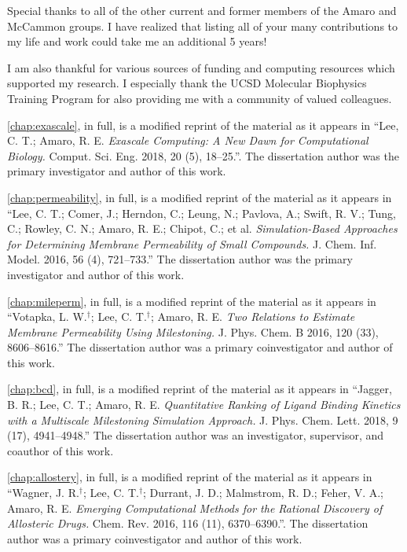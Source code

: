 \begin{frontmatter}
\begin{acknowledgements}
\par Special thanks to all of the other current and former members of the Amaro and McCammon groups.
I have realized that listing all of your many contributions to my life and work could take me an additional 5 years!

\par I am also thankful for various sources of funding and computing resources which supported my research.
I especially thank the UCSD Molecular Biophysics Training Program for also providing me with a community of valued colleagues.

\par \cref{chap:exascale}, in full, is a modified reprint of the material as it appears in ``Lee, C. T.; Amaro, R. E. \emph{Exascale Computing: A New Dawn for Computational Biology.} Comput. Sci. Eng. 2018, 20 (5), 18–25.''.
The dissertation author was the primary investigator and author of this work.

\par \cref{chap:permeability}, in full, is a modified reprint of the material as it appears in ``Lee, C. T.; Comer, J.; Herndon, C.; Leung, N.; Pavlova, A.; Swift, R. V.; Tung, C.; Rowley, C. N.; Amaro, R. E.; Chipot, C.; et al. \emph{Simulation-Based Approaches for Determining Membrane Permeability of Small Compounds.} J. Chem. Inf. Model. 2016, 56 (4), 721–733.''
The dissertation author was the primary investigator and author of this work.

\par \cref{chap:mileperm}, in full, is a modified reprint of the material as it appears in ``Votapka, L. W.$^{\dagger}$; Lee, C. T.$^{\dagger}$; Amaro, R. E. \emph{Two Relations to Estimate Membrane Permeability Using Milestoning.} J. Phys. Chem. B 2016, 120 (33), 8606–8616.''
The dissertation author was a primary coinvestigator and author of this work.

\par \cref{chap:bcd}, in full, is a modified reprint of the material as it appears in ``Jagger, B. R.; Lee, C. T.; Amaro, R. E. \emph{Quantitative Ranking of Ligand Binding Kinetics with a Multiscale Milestoning Simulation Approach.} J. Phys. Chem. Lett. 2018, 9 (17), 4941–4948.''
The dissertation author was an investigator, supervisor, and coauthor of this work.

\par \cref{chap:allostery}, in full, is a modified reprint of the material as it appears in ``Wagner, J. R.$^{\dagger}$; Lee, C. T.$^{\dagger}$; Durrant, J. D.; Malmstrom, R. D.; Feher, V. A.; Amaro, R. E. \emph{Emerging Computational Methods for the Rational Discovery of Allosteric Drugs.} Chem. Rev. 2016, 116 (11), 6370–6390.''.
The dissertation author was a primary coinvestigator and author of this work.


\end{acknowledgements}
\end{frontmatter}

